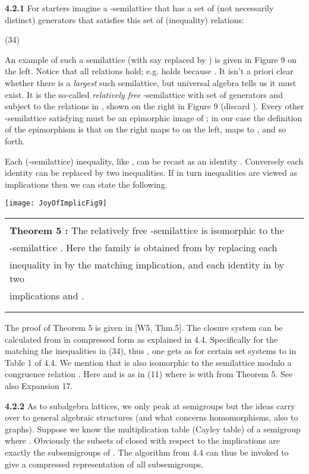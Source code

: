 \documentclass[11pt]{article}
\begin{document}
{\bf 4.2.1} For starters imagine a -semilattice that has a set  of (not necessarily distinct) generators  that satisfies this set  of (inequality) relations:

(34) \quad 


 An example of such a semilattice  (with say  replaced by ) is given in Figure 9 on the left. Notice that all relations hold; e.g.  holds because .
It isn't a priori clear whether there is a {\it largest} such semilattice, but universal algebra tells us it must exist.
 It is the so-called {\it relatively free} -semilattice  with set of generators  and subject to the relations in , shown on the right in Figure 9 (discard ). Every other -semilattice satisfying  must be an epimorphic image of ; in our case the definition of the epimorphism  is that  on the right maps to  on the left,  maps to , and so forth.
 
 Each (-semilattice) inequality, like , can be recast as an identity .  Conversely each identity can be replaced by two inequalities. If in turn inequalities  are viewed as implications  then we can state the following.
 
 
\begin{center}
\texttt{[image: JoyOfImplicFig9]}
\end{center}

\begin{tabular}{|l|} \hline \\
{\bf Theorem 5 :} The relatively free -semilattice  is isomorphic to the\\
-semilattice . Here the family  is obtained from  by replacing
each \\ 
inequality in  by the matching implication, and each identity in  by two\\
implications  and .\\
 \\ \\ \hline \end{tabular} 


The proof of Theorem 5 is given in [W5, Thm.5]. The closure system  can be calculated from  in compressed form as explained in 4.4. Specifically for the  matching the inequalities in (34), thus , one gets  as  for certain set systems  to  in Table 1 of 4.4.  We mention that  is also isomorphic to the semilattice  modulo a congruence relation . Here  and  is as in (11) where  is  with  from Theorem 5.
See also Expansion 17.



{\bf 4.2.2} As to subalgebra lattices, we only peak at semigroups but the ideas carry over to general algebraic structures (and what concerns homomorphisms, also to graphs). Suppose we know the multiplication table (Cayley table) of a semigroup  where . Obviously the subsets of  closed with respect to the  implications  are exactly the subsemigroups of . 
The algorithm from 4.4 can thus be invoked to give a compressed representation of all subsemigroups. 
\end{document}
